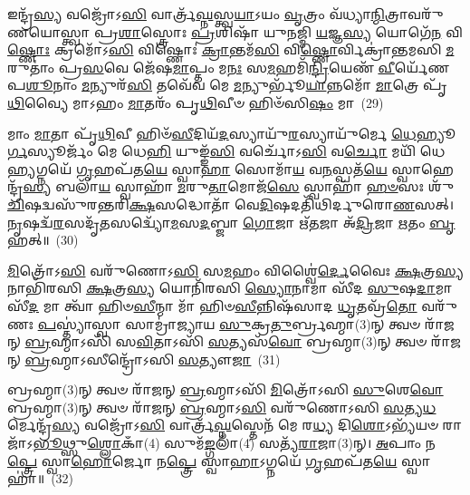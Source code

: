 {\anuvakamend[{\-\ul{𑌅}\-𑌗𑍍𑌨𑍇𑌸𑍍𑌤𑍈𑌕𑌾᳴\-𑌦𑌶 𑌚}]}%

𑌇𑌨𑍍𑌦𑍍𑌰᳴\-\ul{𑌸𑍍𑌯} 𑌵𑌜𑍍𑌰𑍋᳴\-𑌽\-\ul{𑌸𑌿} 𑌵𑌾𑌰𑍍𑌤𑍍𑌰᳴\-\ul{𑌘𑍍𑌨}\-𑌸𑍍𑌤𑍍𑌵\-\ul{𑌯𑌾}\-\-𑌽𑌯𑌂 \ul{𑌵𑍃}\-𑌤𑍍𑌰𑌂 𑌵᳴𑌧𑍍𑌯𑌾\-\ul{𑌨𑍍𑌮𑌿}\-𑌤𑍍𑌰𑌾𑌵𑌰𑍁᳴𑌣\-𑌯𑍋𑌸𑍍𑌤𑍍𑌵𑌾 𑌪𑍍𑌰\-\ul{𑌶𑌾}\-𑌸𑍍𑌤𑍍𑌰𑍋𑌃 \ul{𑌪𑍍𑌰}\-𑌶𑌿𑌷𑌾᳴ 𑌯𑍁𑌨𑌜𑍍𑌮𑌿 \ul{𑌯}\-𑌜𑍍𑌞\-\ul{𑌸𑍍𑌯} 𑌯𑍋𑌗𑍇᳴\-\ul{𑌨} 𑌵𑌿\-\ul{𑌷𑍍𑌣𑍋𑌃} 𑌕𑍍𑌰𑌮𑍋᳴\-𑌽\-\ul{𑌸𑌿} 𑌵𑌿𑌷𑍍𑌣𑍋𑌃॑ \ul{𑌕𑍍𑌰𑌾}\-𑌨𑍍𑌤𑌮᳴\-\ul{𑌸𑌿} 𑌵𑌿\-\ul{𑌷𑍍𑌣𑍋}\-𑌰𑍍𑌵𑌿𑌕𑍍𑌰𑌾॑𑌨𑍍𑌤𑌮𑌸𑌿 \ul{𑌮}\-𑌰𑍁𑌤𑌾𑌂॑ 𑌪𑍍𑌰\-\ul{𑌸}\-𑌵𑍇 𑌜𑍇᳴𑌷\-\ul{𑌮𑌾}\-𑌪𑍍𑌤𑌂 𑌮\-\ul{𑌨𑌃} 𑌸\-\ul{𑌮}\-𑌹𑌮𑌿᳴\-\ul{𑌨𑍍𑌦𑍍𑌰𑌿}\-𑌯𑍇𑌣᳴ \ul{𑌵𑍀}\-𑌰𑍍𑌯𑍇᳴𑌣 𑌪\-\ul{𑌶𑍂}\-𑌨𑌾𑌂 \ul{𑌮}\-𑌨𑍍𑌯𑍁𑌰᳴\-\ul{𑌸𑌿} 𑌤𑌵𑍇᳴𑌵 𑌮𑍇 \ul{𑌮}\-𑌨𑍍𑌯𑍁𑌰𑍍𑌭𑍂᳴\-\ul{𑌯𑌾}\-𑌨𑍍𑌨𑌮𑍋᳴ \ul{𑌮𑌾}\-𑌤𑍍𑌰𑍇 𑌪𑍃᳴\-\ul{𑌥𑌿}\-𑌵𑍍𑌯𑍈 𑌮𑌾\-𑌽𑌹𑌂 \ul{𑌮𑌾}\-𑌤𑌰𑌂᳴ 𑌪𑍃\-\ul{𑌥𑌿}\-𑌵𑍀𑍞 𑌹𑌿𑍞᳴𑌸𑌿\-\ul{𑌷𑌂} 𑌮𑌾~(29)

𑌮𑌾𑌂 \ul{𑌮𑌾}\-𑌤𑌾 𑌪𑍃᳴\-\ul{𑌥𑌿}\-𑌵𑍀 𑌹𑌿𑍞᳴\-\ul{𑌸𑍀}\-𑌦𑌿𑌯᳴\-\ul{𑌦}\-𑌸𑍍𑌯𑌾𑌯𑍁᳴\-\ul{𑌰}\-𑌸𑍍𑌯𑌾𑌯𑍁᳴𑌰𑍍𑌮𑍇 \ul{𑌧𑍇}\-𑌹𑍍𑌯𑍂\-\ul{𑌰𑍍𑌗}\-𑌸𑍍𑌯𑍂𑌰𑍍𑌜𑌂᳴ 𑌮𑍇 𑌧𑍇\-\ul{𑌹𑌿} 𑌯𑍁𑌙𑍍𑌙᳴\-\ul{𑌸𑌿} 𑌵𑌰𑍍𑌚𑍋᳴\-𑌽\-\ul{𑌸𑌿} 𑌵\-\ul{𑌰𑍍𑌚𑍋} 𑌮𑌯𑌿᳴ 𑌧𑍇\-\ul{𑌹𑍍𑌯}\-𑌗𑍍𑌨𑌯𑍇᳴ \ul{𑌗𑍃}\-𑌹𑌪᳴𑌤\-\ul{𑌯𑍇} 𑌸𑍍𑌵𑌾\-\ul{𑌹𑌾} 𑌸𑍋𑌮𑌾᳴\-\ul{𑌯} 𑌵\-\ul{𑌨}\-𑌸𑍍𑌪𑌤᳴\-\ul{𑌯𑍇} 𑌸𑍍𑌵𑌾𑌹𑍇𑌨𑍍𑌦𑍍𑌰᳴\-\ul{𑌸𑍍𑌯} 𑌬𑌲𑌾᳴\-\ul{𑌯} 𑌸𑍍𑌵𑌾𑌹𑌾᳴ \ul{𑌮}\-𑌰𑍁\-\ul{𑌤𑌾}\-𑌮𑍋𑌜᳴\-\ul{𑌸𑍇} 𑌸𑍍𑌵𑌾𑌹𑌾᳴ \ul{𑌹}\-\-\ul{𑍞}\-𑌸𑌃 𑌶𑍁᳴\-\ul{𑌚𑌿}\-𑌷𑌦𑍍𑌵𑌸𑍁᳴𑌰𑌨𑍍𑌤𑌰𑌿\-\ul{𑌕𑍍𑌷}\-\-𑌸𑌦𑍍𑌧𑍋𑌤𑌾᳴ 𑌵𑍇\-\ul{𑌦𑌿}\-𑌷𑌦𑌤𑌿᳴𑌥𑌿𑌰𑍍𑌦𑍁𑌰𑍋\-\ul{𑌣}\-𑌸𑌤𑍍। \ul{𑌨𑍃}\-𑌷𑌦𑍍𑌵᳴\-\ul{𑌰}\-𑌸𑌦𑍃᳴\-\ul{𑌤}\-𑌸𑌦𑍍𑌵𑍍𑌯𑍋᳴\-\ul{𑌮}\-𑌸\-\ul{𑌦}\-𑌬𑍍𑌜𑌾 \ul{𑌗𑍋}\-𑌜𑌾 𑌋᳴\-\ul{𑌤}\-𑌜𑌾 𑌅᳴\-\ul{𑌦𑍍𑌰𑌿}\-𑌜𑌾 \ul{𑌋}\-𑌤𑌂 \ul{𑌬𑍃}\-𑌹𑌤𑍍॥~(30)

{\anuvakamend[{\-\ul{𑌹𑌿}\-\-\ul{𑍞}\-\-\ul{𑌸𑌿}\-\-\ul{𑌷𑌂} 𑌮\-\ul{𑌰𑍍𑌤}\-𑌜𑌾𑌸𑍍𑌤𑍍𑌰𑍀𑌣𑌿᳴ 𑌚}]}%

\-\ul{𑌮𑌿}\-𑌤𑍍𑌰𑍋᳴\-𑌽\-\ul{𑌸𑌿} 𑌵𑌰𑍁᳴𑌣𑍋\-𑌽\-\ul{𑌸𑌿} 𑌸\-\ul{𑌮}\-𑌹𑌂 𑌵𑌿𑌶𑍍𑌵𑍈॑\-\ul{𑌰𑍍𑌦𑍇}\-𑌵𑍈𑌃 \ul{𑌕𑍍𑌷}\-𑌤𑍍𑌰\-\ul{𑌸𑍍𑌯} 𑌨𑌾𑌭𑌿᳴𑌰𑌸𑌿 \ul{𑌕𑍍𑌷}\-𑌤𑍍𑌰\-\ul{𑌸𑍍𑌯} 𑌯𑍋𑌨𑌿᳴𑌰𑌸𑌿 \ul{𑌸𑍍𑌯𑍋}\-𑌨𑌾𑌮𑌾 𑌸𑍀᳴𑌦 \ul{𑌸𑍁}\-𑌷\-\ul{𑌦𑌾}\-𑌮𑌾 𑌸𑍀᳴\-\ul{𑌦} 𑌮𑌾 𑌤𑍍𑌵𑌾᳴ 𑌹𑌿𑍞\-\ul{𑌸𑍀}\-𑌨𑍍𑌮𑌾 𑌮𑌾᳴ 𑌹𑌿𑍞\-\ul{𑌸𑍀}\-𑌨𑍍𑌨𑌿𑌷᳴𑌸𑌾𑌦 \ul{𑌧𑍃}\-𑌤𑌵𑍍𑌰᳴\-\ul{𑌤𑍋} 𑌵𑌰𑍁᳴𑌣𑌃 \ul{𑌪}\-𑌸𑍍𑌤𑍍𑌯𑌾॑𑌸𑍍𑌵𑌾 𑌸𑌾𑌮𑍍𑌰𑌾॑𑌜𑍍𑌯𑌾𑌯 \ul{𑌸𑍁}\-𑌕𑍍𑌰\-\ul{𑌤𑍁}\-𑌰𑍍𑌬𑍍𑌰𑌹𑍍𑌮𑌾(3)𑌨𑍍 𑌤𑍍𑌵𑍞 𑌰𑌾᳴𑌜𑌨𑍍 \ul{𑌬𑍍𑌰}\-𑌹𑍍𑌮𑌾\-𑌽𑌸𑌿᳴ 𑌸\-\ul{𑌵𑌿}\-𑌤𑌾\-𑌽𑌸𑌿᳴ \ul{𑌸}\-𑌤𑍍𑌯𑌸᳴\-\ul{𑌵𑍋} 𑌬𑍍𑌰𑌹𑍍𑌮𑌾(3)𑌨𑍍 𑌤𑍍𑌵𑍞 𑌰𑌾᳴𑌜𑌨𑍍 \ul{𑌬𑍍𑌰}\-𑌹𑍍𑌮𑌾\-𑌽𑌸𑍀𑌨𑍍𑌦𑍍𑌰𑍋᳴\-𑌽𑌸𑌿 \ul{𑌸}\-𑌤𑍍𑌯𑍗\-\ul{𑌜𑌾}\-~(31)

𑌬𑍍𑌰𑌹𑍍𑌮𑌾(3)𑌨𑍍 𑌤𑍍𑌵𑍞 𑌰𑌾᳴𑌜𑌨𑍍 \ul{𑌬𑍍𑌰}\-𑌹𑍍𑌮𑌾\-𑌽𑌸𑌿᳴ \ul{𑌮𑌿}\-𑌤𑍍𑌰𑍋᳴\-𑌽𑌸𑌿 \ul{𑌸𑍁}\-𑌶𑍇\-\ul{𑌵𑍋} 𑌬𑍍𑌰𑌹𑍍𑌮𑌾(3)𑌨𑍍 𑌤𑍍𑌵𑍞 𑌰𑌾᳴𑌜𑌨𑍍 \ul{𑌬𑍍𑌰}\-𑌹𑍍𑌮𑌾\-𑌽\-\ul{𑌸𑌿} 𑌵𑌰𑍁᳴𑌣𑍋\-𑌽𑌸𑌿 \ul{𑌸}\-𑌤𑍍𑌯\-\ul{𑌧}\-𑌰𑍍𑌮𑍇𑌨𑍍𑌦𑍍𑌰᳴\-\ul{𑌸𑍍𑌯} 𑌵𑌜𑍍𑌰𑍋᳴\-𑌽\-\ul{𑌸𑌿} 𑌵𑌾𑌰𑍍𑌤𑍍𑌰᳴\-\ul{𑌘𑍍𑌨}\-𑌸𑍍𑌤𑍇𑌨᳴ 𑌮𑍇 𑌰\-\ul{𑌧𑍍𑌯} 𑌦𑌿\-\ul{𑌶𑍋}\-\-𑌽𑌭𑍍𑌯᳴𑌯𑍞 𑌰𑌾𑌜𑌾᳴\-𑌽\-\ul{𑌭𑍂}\-𑌥𑍍𑌸𑍁\-\ul{𑌶𑍍𑌲𑍋}\-𑌕𑌾𑌁(4) 𑌸𑍁𑌮᳴\-\ul{𑌙𑍍𑌗}\-𑌲𑌾𑌁(4) 𑌸𑌤𑍍𑌯᳴\-\ul{𑌰𑌾}\-𑌜𑌾(3)𑌨𑍍। \ul{𑌅}\-𑌪𑌾𑌂 𑌨\-\ul{𑌪𑍍𑌤𑍍𑌰𑍇} 𑌸𑍍𑌵𑌾\-\ul{𑌹𑍋}\-𑌰𑍍𑌜𑍋 𑌨\-\ul{𑌪𑍍𑌤𑍍𑌰𑍇} 𑌸𑍍𑌵𑌾\-\ul{𑌹𑌾}\-\-𑌽𑌗𑍍𑌨𑌯𑍇᳴ \ul{𑌗𑍃}\-𑌹𑌪᳴𑌤\-\ul{𑌯𑍇} 𑌸𑍍𑌵𑌾𑌹𑌾॑॥~(32)

